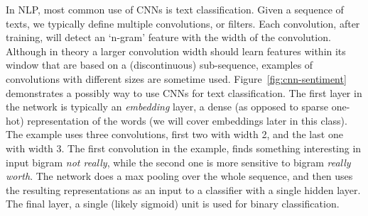 In NLP, most common use of CNNs is text classification.
Given a sequence of texts,
we typically define multiple convolutions, or filters.
Each convolution, after training,
will detect an `n-gram' feature with the width of the convolution.
Although in theory a larger convolution width should learn
features within its window that are based on a (discontinuous) sub-sequence,
examples of convolutions with different sizes are sometime used.
Figure~\ref{fig:cnn-sentiment} demonstrates a possibly way to use
CNNs for text classification.
The first layer in the network is typically an \emph{embedding} layer,
a dense (as opposed to sparse one-hot) representation of the words
(we will cover embeddings later in this class). 
The example uses three convolutions,
first two with width \num{2},
and the last one with width \num{3}.
The first convolution in the example, finds something interesting
in input bigram \emph{not really},
while the second one is more sensitive to bigram \emph{really worth}.
The network does a max pooling over the whole sequence,
and then uses the resulting representations as an input to
a classifier with a single hidden layer.
The final layer, a single (likely sigmoid) unit is used for binary classification.


